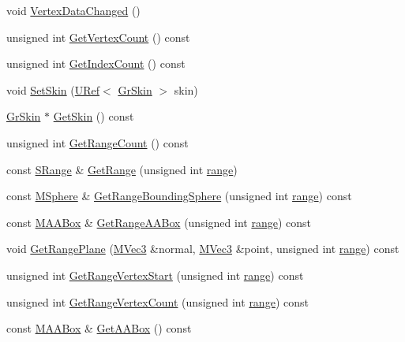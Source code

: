 \begin{CompactItemize}
\item 
void \hyperlink{class_gr_mesh_a3a4f0ec27a7c9484f2dc57363030c24}{VertexDataChanged} ()
\item 
unsigned int \hyperlink{class_gr_mesh_3b42e0893f6ac4d502122860069a88b8}{GetVertexCount} () const 
\item 
unsigned int \hyperlink{class_gr_mesh_501d594b2d86fd5f5519477e88b94471}{GetIndexCount} () const 
\item 
void \hyperlink{class_gr_mesh_ca24f02b9e2cf3342a81f9ee1493f6ea}{SetSkin} (\hyperlink{class_u_ref}{URef}$<$ \hyperlink{class_gr_skin}{GrSkin} $>$ skin)
\item 
\hyperlink{class_gr_skin}{GrSkin} $\ast$ \hyperlink{class_gr_mesh_c0e189866d26fbb6f47f53e84168f936}{GetSkin} () const 
\item 
unsigned int \hyperlink{class_gr_mesh_9ba0c112005117c8c77be35fca892c03}{GetRangeCount} () const 
\item 
const \hyperlink{struct_gr_mesh_1_1_s_range}{SRange} \& \hyperlink{class_gr_mesh_fab649dd273299791c3813c96224ae75}{GetRange} (unsigned int \hyperlink{glext__bak_8h_7b8ad0b27a927682837f95528fa454f5}{range})
\item 
const \hyperlink{class_m_sphere}{MSphere} \& \hyperlink{class_gr_mesh_2d67438c5107a3846d7f8eae065dd515}{GetRangeBoundingSphere} (unsigned int \hyperlink{glext__bak_8h_7b8ad0b27a927682837f95528fa454f5}{range}) const 
\item 
const \hyperlink{class_m_a_a_box}{MAABox} \& \hyperlink{class_gr_mesh_f6da12bd6191e5489bf3f7080146de14}{GetRangeAABox} (unsigned int \hyperlink{glext__bak_8h_7b8ad0b27a927682837f95528fa454f5}{range}) const 
\item 
void \hyperlink{class_gr_mesh_d0b90ad938d228f7cdce75600e9fc937}{GetRangePlane} (\hyperlink{class_m_vec3}{MVec3} \&normal, \hyperlink{class_m_vec3}{MVec3} \&point, unsigned int \hyperlink{glext__bak_8h_7b8ad0b27a927682837f95528fa454f5}{range}) const 
\item 
unsigned int \hyperlink{class_gr_mesh_de8aa56cad498c5eb9e362fd3e5618cd}{GetRangeVertexStart} (unsigned int \hyperlink{glext__bak_8h_7b8ad0b27a927682837f95528fa454f5}{range}) const 
\item 
unsigned int \hyperlink{class_gr_mesh_47e18fec5f6a5e448cff0b5f27008aa6}{GetRangeVertexCount} (unsigned int \hyperlink{glext__bak_8h_7b8ad0b27a927682837f95528fa454f5}{range}) const 
\item 
const \hyperlink{class_m_a_a_box}{MAABox} \& \hyperlink{class_gr_mesh_bdf6308d6dad1cb3d3ca3330f0138049}{GetAABox} () const 

\end{CompactItemize}

